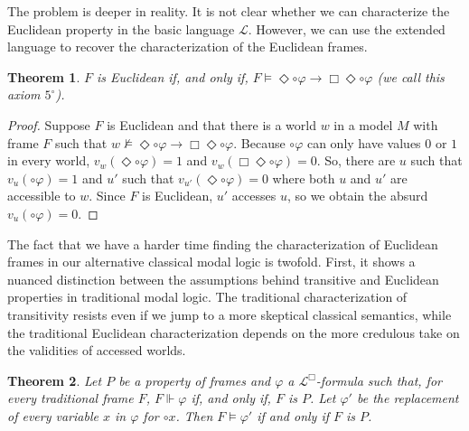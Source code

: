 \documentclass{amsart}
\newtheorem{theorem}{Theorem}[section]
\newcommand{\so}{\rightarrow}
\newcommand{\cl}{\mathcal{L}}
\begin{document}
The problem is deeper in reality. It is not clear whether we can characterize the Euclidean property in the basic language $\mathcal{L}$. However, we can use the extended language to recover the characterization of the Euclidean frames.

\begin{theorem}\label{Euc_yes} $F$ is Euclidean if, and only if, $F \vDash \Diamond \circ \varphi \so \Box \Diamond \circ \varphi$ (we call this axiom $5^\circ$).
\end{theorem}

\begin{proof}
    Suppose $F$ is Euclidean and that there is a world $w$ in a model $M$ with frame $F$ such that $w \nvDash \Diamond \circ \varphi \so \Box \Diamond \circ \varphi$. Because $\circ \varphi$ can only have values $0$ or $1$ in every world, $v_w(\Diamond \circ \varphi) = 1$ and $v_w(\Box \Diamond \circ \varphi) = 0$. So, there are $u$ such that $v_u(\circ \varphi) = 1$ and $u'$ such that $v_{u'}(\Diamond \circ \varphi) = 0$ where both $u$ and $u'$ are accessible to $w$. Since $F$ is Euclidean, $u'$ accesses $u$, so we obtain the absurd $v_u(\circ \varphi) = 0$.
\end{proof}

The fact that we have a harder time finding the characterization of Euclidean frames in our alternative classical modal logic is twofold. First, it shows a nuanced distinction between the assumptions behind transitive and Euclidean properties in traditional modal logic. The traditional characterization of transitivity resists even if we jump to a more skeptical classical semantics, while the traditional Euclidean characterization depends on the more credulous take on the validities of accessed worlds.

\begin{theorem}\label{two-direction-preservation}
    Let $P$ be a property of frames and $\varphi$ a $\cl^\Box$-formula such that, for every traditional frame $F$, 
    $F \Vdash \varphi$ if, and only if, $F$ is $P$. 
    Let $\varphi'$ be the replacement of every variable $x$ in $\varphi$ for $\circ x$.
    Then $F \vDash \varphi'$ if and only if $F$ is $P$.
\end{theorem}
\end{document}

